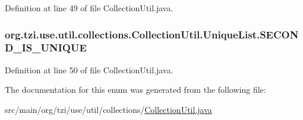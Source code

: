 Definition at line 49 of file Collection\-Util.\-java.

\hypertarget{enumorg_1_1tzi_1_1use_1_1util_1_1collections_1_1_collection_util_1_1_unique_list_a305934989dfd6d0313543b74a538db67}{
\subsubsection[{S\-E\-C\-O\-N\-D\-\_\-\-I\-S\-\_\-\-U\-N\-I\-Q\-U\-E}]{\setlength{\rightskip}{0pt plus 5cm}org.\-tzi.\-use.\-util.\-collections.\-Collection\-Util.\-Unique\-List.\-S\-E\-C\-O\-N\-D\-\_\-\-I\-S\-\_\-\-U\-N\-I\-Q\-U\-E}}\label{enumorg_1_1tzi_1_1use_1_1util_1_1collections_1_1_collection_util_1_1_unique_list_a305934989dfd6d0313543b74a538db67}


Definition at line 50 of file Collection\-Util.\-java.



The documentation for this enum was generated from the following file\-:\begin{DoxyCompactItemize}
\item 
src/main/org/tzi/use/util/collections/\hyperlink{_collection_util_8java}{Collection\-Util.\-java}\end{DoxyCompactItemize}
